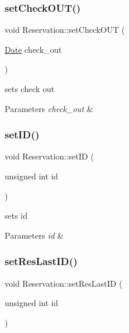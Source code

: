 \subsubsection{\texorpdfstring{set\+Check\+O\+U\+T()}{setCheckOUT()}}
{\footnotesize\ttfamily void Reservation\+::set\+Check\+O\+UT (\begin{DoxyParamCaption}\item[{\hyperlink{class_date}{Date}}]{check\+\_\+out }\end{DoxyParamCaption})\hspace{0.3cm}{\ttfamily [inline]}}



sets check out 


\begin{DoxyParams}{Parameters}
{\em check\+\_\+out} & \\
\hline
\end{DoxyParams}
\hypertarget{class_reservation_a81e0f9725cb37ec2abb9669691ca4440}{}\label{class_reservation_a81e0f9725cb37ec2abb9669691ca4440} 
\subsubsection{\texorpdfstring{set\+I\+D()}{setID()}}
{\footnotesize\ttfamily void Reservation\+::set\+ID (\begin{DoxyParamCaption}\item[{unsigned int}]{id }\end{DoxyParamCaption})\hspace{0.3cm}{\ttfamily [inline]}}



sets id 


\begin{DoxyParams}{Parameters}
{\em id} & \\
\hline
\end{DoxyParams}
\hypertarget{class_reservation_ad4f0df816beef2705e8b1ac555ce6243}{}\label{class_reservation_ad4f0df816beef2705e8b1ac555ce6243} 
\subsubsection{\texorpdfstring{set\+Res\+Last\+I\+D()}{setResLastID()}}
{\footnotesize\ttfamily void Reservation\+::set\+Res\+Last\+ID (\begin{DoxyParamCaption}\item[{unsigned int}]{id }\end{DoxyParamCaption})\hspace{0.3cm}{\ttfamily [static]}}



